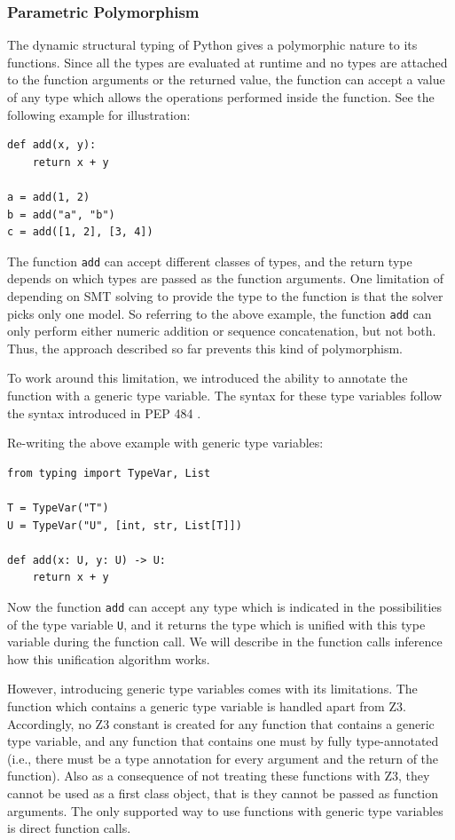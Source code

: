 \subsubsection{Parametric Polymorphism}
The dynamic structural typing of Python gives a polymorphic nature to its functions. Since all the types are evaluated at runtime and no types are attached to the function arguments or the returned value, the function can accept a value of any type which allows the operations performed inside the function. See the following example for illustration:
\begin{lstlisting}
def add(x, y):
	return x + y
	
a = add(1, 2)
b = add("a", "b")
c = add([1, 2], [3, 4])
\end{lstlisting}

The function \lstinline|add| can accept different classes of types, and the return type depends on which types are passed as the function arguments. One limitation of depending on SMT solving to provide the type to the function is that the solver picks only one model. So referring to the above example, the function \lstinline|add| can only perform either numeric addition or sequence concatenation, but not both. Thus, the approach described so far prevents this kind of polymorphism.

To work around this limitation, we introduced the ability to annotate the function with a generic type variable. The syntax for these type variables follow the syntax introduced in PEP 484 \cite{484}.

Re-writing the above example with generic type variables:

\begin{lstlisting}
from typing import TypeVar, List

T = TypeVar("T")
U = TypeVar("U", [int, str, List[T]])

def add(x: U, y: U) -> U:
	return x + y
\end{lstlisting}
Now the function \lstinline|add| can accept any type which is indicated in the possibilities of the type variable \lstinline|U|, and it returns the type which is unified with this type variable during the function call. We will describe in the function calls inference how this unification algorithm works.

However, introducing generic type variables comes with its limitations. The function which contains a generic type variable is handled apart from Z3. Accordingly, no Z3 constant is created for any function that contains a generic type variable, and any function that contains one must by fully type-annotated (i.e., there must be a type annotation for every argument and the return of the function). Also as a consequence of not treating these functions with Z3, they cannot be used as a first class object, that is they cannot be passed as function arguments. The only supported way to use functions with generic type variables is direct function calls.
